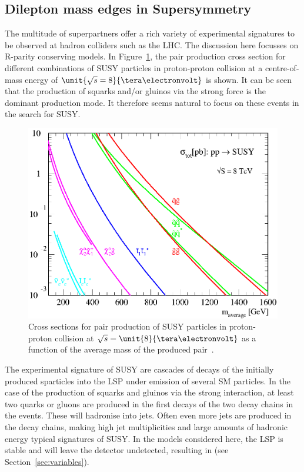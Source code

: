\subsection{Dilepton mass edges in Supersymmetry}
\label{sec:edges}
The multitude of superpartners offer a rich variety of experimental signatures to be observed at hadron colliders such as the LHC. The discussion here focusses on R-parity conserving models. In Figure~\ref{fig:SUSYXSecs}, the pair production cross section for different combinations of SUSY particles in proton-proton collision at a centre-of-mass energy of $\unit{\sqrt{s}=8}{\tera\electronvolt}$ is shown. It can be seen that the production of squarks and/or gluinos via the strong force is the dominant production mode. It therefore seems natural to focus on these events in the search for SUSY.
\begin{figure}
\centering
\includegraphics[scale=0.6]{plots/THEO/prospino_lhc8.eps}
\caption{Cross sections for pair production of SUSY particles in proton-proton collision at $\sqrt{s} = \unit{8}{\tera\electronvolt}$ as a function of the average mass of the produced pair~\cite{ProspinoPlot,Beenakker:1999xh,Beenakker:1997ut,bib-nlo-nll-01}.}
\label{fig:SUSYXSecs}
\end{figure}

The experimental signature of SUSY are cascades of decays of the initially produced sparticles into the LSP under emission of several SM particles. In the case of the production of squarks and gluinos via the strong interaction, at least two quarks or gluons are produced in the first decays of the two decay chains in the events. These will hadronise into jets. Often even more jets are produced in the decay chains, making high jet multiplicities and large amounts of hadronic energy typical signatures of SUSY. In the models considered here, the LSP is stable and will leave the detector undetected, resulting in \MET (see Section~\ref{sec:variables}).

